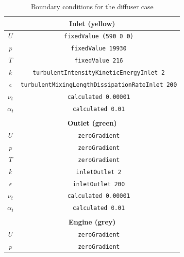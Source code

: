             \begin{table}[h!]
        \centering
           \footnotesize
        \caption{Boundary conditions for the diffuser case}
        \label{table:BCdiffuser}

        \begin{tabular}{cc}
        \multicolumn{2}{c}{\textbf{Inlet (yellow)}}          \\
        \hline
        $U$                    & \texttt{fixedValue (590 0 0)}           \\
        $p$                     &  \texttt{fixedValue 19930}          \\
        $T$                     &  \texttt{fixedValue 216}          \\
        $k$                    & \texttt{turbulentIntensityKineticEnergyInlet 2}  \\
        $\epsilon$                    &      \texttt{turbulentMixingLengthDissipationRateInlet 200} \\
        $\nu_t$                    & \texttt{calculated 0.00001}           \\
        $\alpha_t$                    & \texttt{calculated 0.01}           \\
        & \\
        \multicolumn{2}{c}{\textbf{Outlet (green)}}          \\
        \hline
        $U$                   & \texttt{zeroGradient}           \\
        $p$                     &  \texttt{zeroGradient}          \\
        $T$                     &  \texttt{zeroGradient}          \\
        $k$                    & \texttt{inletOutlet 2}           \\
        $\epsilon$                    & \texttt{inletOutlet 200}           \\
        $\nu_t$                    & \texttt{calculated 0.00001}           \\
        $\alpha_t$                    & \texttt{calculated 0.01}           \\
        & \\
        \multicolumn{2}{c}{\textbf{Engine (grey)}}      \\
        \hline
        $U$                    & \texttt{zeroGradient}           \\
        $p$                     &  \texttt{zeroGradient}          \\

\end{tabular}
\end{table}
